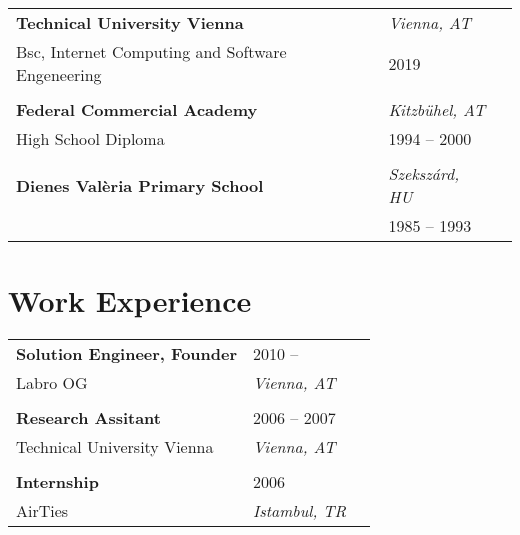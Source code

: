 \documentclass[letterpaper,11pt]{article}
\begin{document}
\vspace{-1em}
\begin{longtable}{  L{0.70\textwidth}  R{0.25\textwidth}  R{0.05\textwidth }} 
		\textbf{Technical University Vienna} &  \textit{Vienna, AT} \\

	Bsc, Internet Computing and Software Engeneering & 2019 \\ 
\vspace{1pt}\\
		\textbf{Federal Commercial Academy} &  \textit{Kitzb\"{u}hel, AT} \\

	High School Diploma & 1994 -- 2000 \\ 
\vspace{1pt}\\
		\textbf{Dienes Val\`{e}ria Primary School} &  \textit{Szeksz\'{a}rd, HU} \\

	 & 1985 -- 1993 \\ 

\end{longtable}


\section{\bf Work Experience}
\vspace{-1em}
\begin{longtable}{  L{0.70\textwidth}  R{0.25\textwidth}  R{0.05\textwidth }} 
\textbf{Solution Engineer, Founder} & 2010 -- \\
Labro OG & \textit{Vienna, AT} \\
\vspace{1pt}\\
\textbf{Research Assitant} & 2006 -- 2007\\
Technical University Vienna & \textit{Vienna, AT} \\
\vspace{1pt}\\
\textbf{Internship} & 2006\\
AirTies & \textit{Istambul, TR} \\
\end{longtable}
\end{document}
